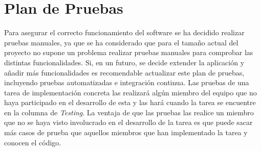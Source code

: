 \section{Plan de Pruebas}
\label{cap:pruebas}

Para asegurar el correcto funcionamiento del software se ha decidido realizar pruebas manuales, ya que se ha considerado que para el tamaño actual del proyecto no supone un problema realizar pruebas manuales para comprobar las distintas funcionalidades. Si, en un futuro, se decide extender la aplicación y añadir más funcionalidades es recomendable actualizar este plan de pruebas, incluyendo pruebas automatizadas e integración continua. Las pruebas de una tarea de implementación concreta las realizará algún miembro del equipo que no haya participado en el desarrollo de esta y las hará cuando la tarea se encuentre en la columna de \textit{Testing}. La ventaja de que las pruebas las realice un miembro que no se haya visto involucrado en el desarrollo de la tarea es que puede sacar más casos de prueba que aquellos miembros que han implementado la tarea y conocen el código.

